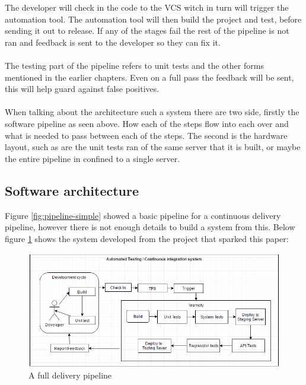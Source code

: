 The developer will check in the code to the VCS witch in turn will trigger the automation tool. The automation tool will then build the project and test, before sending it out to release. If any of the stages fail the rest of the pipeline is not ran and feedback is sent to the developer so they can fix it.
\\\\
The testing part of the pipeline refers to unit tests and the other forms mentioned in the earlier chapters. Even on a full pass the feedback will be sent, this will help guard against false positives.
\\\\
When talking about the architecture such a system there are two side, firstly the software pipeline as seen above. How each of the steps flow into each over and what is needed to pass between each of the steps. The second is the hardware layout,  such as are the unit tests ran of the same server that it is built, or maybe the entire pipeline in confined to a single server.

\subsection{Software architecture}

Figure \ref{fig:pipeline-simple} showed a basic pipeline for a continuous delivery pipeline, however there is not enough details to build a system from this. Below figure \ref{fig:bsipipeline} shows the system developed from the project that sparked this paper:

\begin{figure}[H]
	\centering
	\includegraphics[scale=0.6]{images/bsipipleine.png}
	\caption{A full delivery pipeline}
	\label{fig:bsipipeline}
\end{figure}

